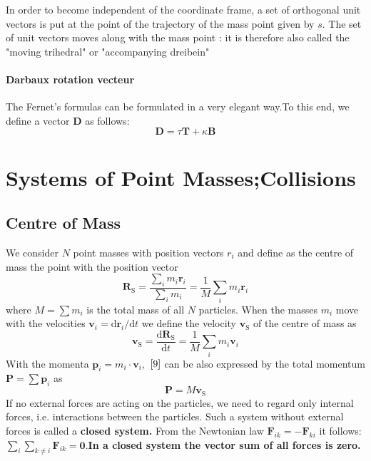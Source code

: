 \documentclass[12pt]{book}
\theoremstyle{definition}\newtheorem{dfn}{Définition}[chapter]
\theoremstyle{plain}\newtheorem{thm}{Théorème}[chapter]
\theoremstyle{plain}\newtheorem{prp}{Proposition}[chapter]
\theoremstyle{plain}\newtheorem{lem}{\bf Lemme}[chapter]
\theoremstyle{plain}\newtheorem{axm}{\bf Axiome}[chapter]
\theoremstyle{plain}\newtheorem{lmm}{\bf Lemme}[chapter]
\theoremstyle{plain}\newtheorem{cor}{\bf Corollaire}[chapter]
\theoremstyle{remark}\newtheorem{rem}{Remarque}[chapter]
\begin{document}
In order to become independent of the coordinate frame, a set of orthogonal unit vectors
is put at the point of the trajectory of the mass point given by $s$.
The set of unit vectors moves along with the mass point : it is therefore also called the "moving trihedral" or "accompanying dreibein"
\paragraph{Darbaux rotation vecteur}
The Fernet's formulas can be formulated in a very elegant way.To this end, we define a vector $\mathbf{D}$ as follows:
$$\mathbf{D}=\tau \mathbf{T}+\kappa \mathbf{B}$$

\section{Systems of Point Masses;Collisions}

\subsection{Centre of Mass}
We consider $N$ point masses with position vectors $r_{i}$ and define as the centre of mass the point with the position vector
\begin{equation}
\boldsymbol{R}_{\mathrm{S}}=\frac{\sum_{i} m_{i} \boldsymbol{r}_{i}}{\sum_{i} m_{i}}=\frac{1}{M} \sum_{i} m_{i} \boldsymbol{r}_{i}\label{8}
\end{equation}
where $M=\sum m_{i}$ is the total mass of all $N$ particles.
When the masses $m_{i}$ move with the velocities $\boldsymbol{v}_{i}=\mathrm{d} \boldsymbol{r}_{i} / \mathrm{d} t$ we define the velocity $\boldsymbol{v_{\mathrm{S}}}$ of the centre of mass as
\begin{equation}
\boldsymbol{v_{\mathrm{S}}}=\frac{\mathrm{d} \boldsymbol{R}_{\mathrm{S}}}{\mathrm{d} t}=\frac{1}{M} \sum_{i} m_{i} \boldsymbol{v}_{i}\label{9}
\end{equation}
With the momenta $\boldsymbol{p}_{i}=m_{i} \cdot \boldsymbol{v}_{i},$ $\ref{9}$ can be also expressed by the total momentum $\boldsymbol{P}=\sum \boldsymbol{p}_{i}$ as
\begin{equation}
\boldsymbol{P}=M \boldsymbol{v_{\mathrm{S}}}
\end{equation}
If no external forces are acting on the particles, we need to regard only internal forces, i.e. interactions between the particles. Such a system without external forces is called a {\bf closed system.}
From the Newtonian law $\boldsymbol{F}_{i k}=-\boldsymbol{F}_{k i}$ it follows: $\sum_{i} \sum_{k \neq i} \boldsymbol{F}_{i k}=\boldsymbol{0}.${\bf In a closed system the vector sum of all forces is zero.}
\end{document}
